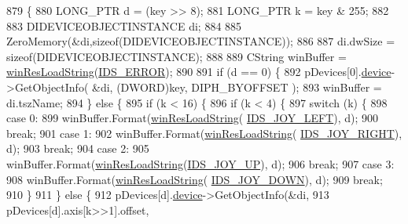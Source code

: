 \begin{DoxyCode}
879 \{
880     LONG\_PTR d = (key >> 8);
881     LONG\_PTR k = key & 255;
882 
883     DIDEVICEOBJECTINSTANCE di;
884 
885     ZeroMemory(&di,\textcolor{keyword}{sizeof}(DIDEVICEOBJECTINSTANCE));
886 
887     di.dwSize = \textcolor{keyword}{sizeof}(DIDEVICEOBJECTINSTANCE);
888 
889     CString winBuffer = \mbox{\hyperlink{_win_res_util_8cpp_a416e85e80ab9b01376e87251c83d1a5a}{winResLoadString}}(\mbox{\hyperlink{resource_8h_a37a752d521d112ae1c29926245bfbdb3}{IDS\_ERROR}});
890 
891     \textcolor{keywordflow}{if} (d == 0) \{
892         pDevices[0].\mbox{\hyperlink{structdevice_info_a4e2b017b67b850eb267097f95776273f}{device}}->GetObjectInfo( &di, (DWORD)key, DIPH\_BYOFFSET );
893         winBuffer = di.tszName;
894     \} \textcolor{keywordflow}{else} \{
895         \textcolor{keywordflow}{if} (k < 16) \{
896             \textcolor{keywordflow}{if} (k < 4) \{
897                 \textcolor{keywordflow}{switch} (k) \{
898                 \textcolor{keywordflow}{case} 0:
899                     winBuffer.Format(\mbox{\hyperlink{_win_res_util_8cpp_a416e85e80ab9b01376e87251c83d1a5a}{winResLoadString}}(
      \mbox{\hyperlink{resource_8h_ad32682ac25366c72bba816946e68cd15}{IDS\_JOY\_LEFT}}), d);
900                     \textcolor{keywordflow}{break};
901                 \textcolor{keywordflow}{case} 1:
902                     winBuffer.Format(\mbox{\hyperlink{_win_res_util_8cpp_a416e85e80ab9b01376e87251c83d1a5a}{winResLoadString}}(
      \mbox{\hyperlink{resource_8h_a2626dba528cae87166f55780e6519ece}{IDS\_JOY\_RIGHT}}), d);
903                     \textcolor{keywordflow}{break};
904                 \textcolor{keywordflow}{case} 2:
905                     winBuffer.Format(\mbox{\hyperlink{_win_res_util_8cpp_a416e85e80ab9b01376e87251c83d1a5a}{winResLoadString}}(\mbox{\hyperlink{resource_8h_aabfff1558ab3cba5b93e56f636c511a0}{IDS\_JOY\_UP}}), d);
906                     \textcolor{keywordflow}{break};
907                 \textcolor{keywordflow}{case} 3:
908                     winBuffer.Format(\mbox{\hyperlink{_win_res_util_8cpp_a416e85e80ab9b01376e87251c83d1a5a}{winResLoadString}}(
      \mbox{\hyperlink{resource_8h_a7f422591d4c14bff69859ee7a72b09fb}{IDS\_JOY\_DOWN}}), d);
909                     \textcolor{keywordflow}{break};
910                 \}
911             \} \textcolor{keywordflow}{else} \{
912                 pDevices[d].\mbox{\hyperlink{structdevice_info_a4e2b017b67b850eb267097f95776273f}{device}}->GetObjectInfo(&di,
913                                                   pDevices[d].axis[k>>1].offset,

\end{DoxyCode}
